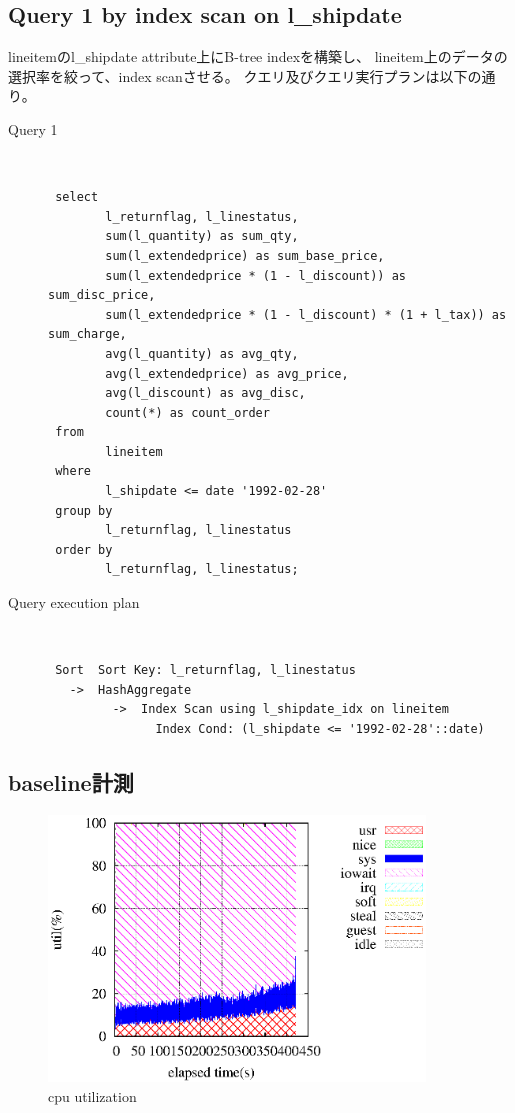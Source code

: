 \documentclass[11pt,a4paper]{jsarticle}
\begin{document}
\subsection{Query 1 by index scan on l\_shipdate}
lineitemのl\_shipdate attribute上にB-tree indexを構築し、
lineitem上のデータの選択率を絞って、index scanさせる。
クエリ及びクエリ実行プランは以下の通り。
\begin{description}
 \item[Query 1]\mbox{}\\
 \begin{verbatim}
 select
        l_returnflag, l_linestatus,
        sum(l_quantity) as sum_qty,
        sum(l_extendedprice) as sum_base_price,
        sum(l_extendedprice * (1 - l_discount)) as sum_disc_price,
        sum(l_extendedprice * (1 - l_discount) * (1 + l_tax)) as sum_charge,
        avg(l_quantity) as avg_qty,
        avg(l_extendedprice) as avg_price,
        avg(l_discount) as avg_disc,
        count(*) as count_order
 from
        lineitem
 where
        l_shipdate <= date '1992-02-28'
 group by
        l_returnflag, l_linestatus
 order by
        l_returnflag, l_linestatus;
 \end{verbatim}
 \item[Query execution plan]\mbox{}\\
 \small{
 \begin{verbatim}
 Sort  Sort Key: l_returnflag, l_linestatus
   ->  HashAggregate
         ->  Index Scan using l_shipdate_idx on lineitem
               Index Cond: (l_shipdate <= '1992-02-28'::date)
 \end{verbatim}
 }
\end{description}

\clearpage
\subsection{baseline計測}

\begin{figure}[thbp]
 \begin{center}
  \includegraphics[width=100mm]{1idxscan_ra2048core1.eps}
 \end{center}
 \caption{cpu utilization}
 \label{fig:1idx2048core1}
\end{figure}
\end{document}
